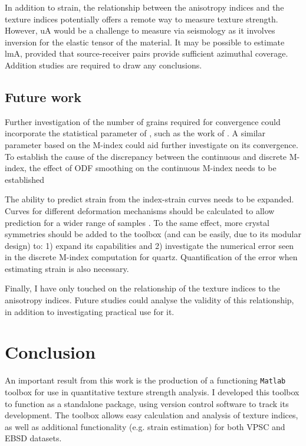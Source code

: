 \documentclass[a4paper,12pt,twoside]{report}
\numberwithin{equation}{chapter}
\begin{document}
In addition to strain, the relationship between the anisotropy indices and the texture indices potentially offers a remote way to measure texture strength. However, uA would be a challenge to measure via seismology as it involves inversion for the elastic tensor of the material. It may be possible to estimate lmA, provided that source-receiver pairs provide sufficient azimuthal coverage. Addition studies are required to draw any conclusions.   
  


\section{Future work}

Further investigation of the number of grains required for convergence could incorporate the statistical parameter of \cite{Pospiech1994}, such as the work of \cite{Bozzolo2007}. A similar parameter based on the M-index could aid further investigate on its convergence. To establish the cause of the discrepancy between the continuous and discrete M-index, the effect of ODF smoothing on the continuous M-index needs to be established \citep[possibly by analysing the kernel method of][]{Hielscher2008} 

The ability to predict strain from the index-strain curves needs to be expanded. Curves for different deformation mechanisms should be calculated to allow prediction for a wider range of samples \citep[possibly using more advanced texture modelling e.g.][]{PonteCastañeda2002}. To the same effect, more crystal symmetries should be added to the toolbox (and can be easily, due to its modular design) to: 1) expand its capabilities and 2) investigate the numerical error seen in the discrete M-index computation for quartz. Quantification of the error when estimating strain is also necessary.

Finally, I have only touched on the relationship of the texture indices to the anisotropy indices. Future studies could analyse the validity of this relationship, in addition to investigating practical use for it.  



\chapter{Conclusion} \label{chap:conclusion}
\vspace{-1cm}
An important result from this work is the production of a functioning \texttt{Matlab} toolbox for use in quantitative texture strength analysis. I developed this toolbox to function as a standalone package, using version control software to track its development. The toolbox allows easy calculation and analysis of texture indices, as well as additional functionality (e.g. strain estimation) for both VPSC and EBSD datasets. 
\end{document}
